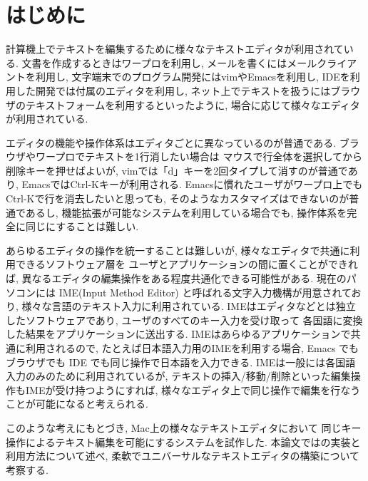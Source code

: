 \section{はじめに}

計算機上でテキストを編集するために様々なテキストエディタが利用されている.
文書を作成するときはワープロを利用し,
メールを書くにはメールクライアントを利用し,
文字端末でのプログラム開発にはvimやEmacsを利用し,
IDEを利用した開発では付属のエディタを利用し,
ネット上でテキストを扱うにはブラウザのテキストフォームを利用するといったように,
場合に応じて様々なエディタが利用されている.

エディタの機能や操作体系はエディタごとに異なっているのが普通である.
ブラウザやワープロでテキストを1行消したい場合は
マウスで行全体を選択してから削除キーを押せばよいが,
vimでは「d」キーを2回タイプして消すのが普通であり,
EmacsではCtrl-Kキーが利用される.
Emacsに慣れたユーザがワープロ上でもCtrl-Kで行を消去したいと思っても,
そのようなカスタマイズはできないのが普通であるし,
機能拡張が可能なシステムを利用している場合でも,
操作体系を完全に同じにすることは難しい.

あらゆるエディタの操作を統一することは難しいが,
様々なエディタで共通に利用できるソフトウェア層を
ユーザとアプリケーションの間に置くことができれば,
異なるエディタの編集操作をある程度共通化できる可能性がある.
%
現在のパソコンには IME(Input Method Editor) と呼ばれる文字入力機構が用意されており,
様々な言語のテキスト入力に利用されている.
IMEはエディタなどとは独立したソフトウェアであり,
ユーザのすべてのキー入力を受け取って
各国語に変換した結果をアプリケーションに送出する.
IMEはあらゆるアプリケーションで共通に利用されるので,
たとえば日本語入力用のIMEを利用する場合,
Emacs でもブラウザでも IDE でも同じ操作で日本語を入力できる.
IMEは一般には各国語入力のみのために利用されているが,
テキストの挿入/移動/削除といった編集操作もIMEが受け持つようにすれば,
様々なエディタ上で同じ操作で編集を行なうことが可能になると考えられる.

このような考えにもとづき,
Mac上の様々なテキストエディタにおいて
同じキー操作によるテキスト編集を可能にする{\system}システムを試作した.
本論文では{\system}の実装と利用方法について述べ,
柔軟でユニバーサルなテキストエディタの構築について考察する.
